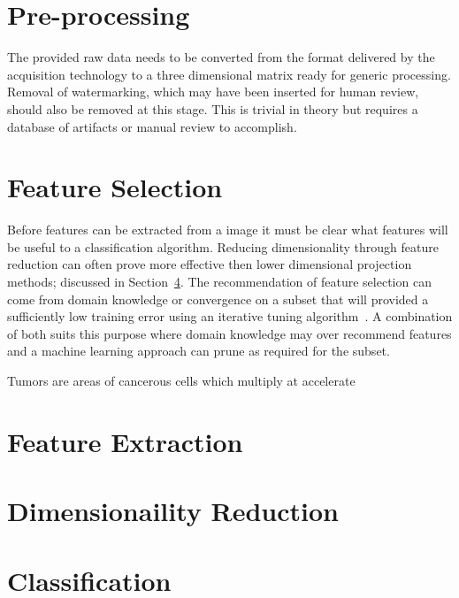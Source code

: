 \documentclass[journal]{IEEEtran}
\begin{document}
\section{Pre-processing}
\label{sec:pre}

The provided raw data needs to be converted from the format delivered by the acquisition technology to a three dimensional matrix ready for generic processing.
Removal of watermarking, which may have been inserted for human review, should also be removed at this stage. 
This is trivial in theory but requires a database of artifacts or manual review to accomplish.








\section{Feature Selection}
\label{sec:selection}
Before features can be extracted from a image it must be clear what features will be useful to a classification algorithm.
Reducing dimensionality through feature reduction can often prove more effective then lower dimensional projection methods; discussed in Section~\ref{sec:reduce}.
The recommendation of feature selection can come from domain knowledge or convergence on a subset that will provided a sufficiently low training error using an iterative tuning algorithm~\cite{bu07feature,li10tumor}.
A combination of both suits this purpose where domain knowledge may over recommend features and a machine learning approach can prune as required for the subset.  

Tumors are areas of cancerous cells which multiply at accelerate 



\section{Feature Extraction}
\label{sec:extraction}





\section{Dimensionaility Reduction}
\label{sec:reduce}




\section{Classification}
\label{sec:class}
\end{document}
